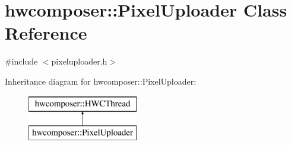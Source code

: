 \hypertarget{classhwcomposer_1_1PixelUploader}{}\section{hwcomposer\+:\+:Pixel\+Uploader Class Reference}
\label{classhwcomposer_1_1PixelUploader}


{\ttfamily \#include $<$pixeluploader.\+h$>$}

Inheritance diagram for hwcomposer\+:\+:Pixel\+Uploader\+:\begin{figure}[H]
\begin{center}
\leavevmode
\includegraphics[height=2.000000cm]{classhwcomposer_1_1PixelUploader}
\end{center}
\end{figure}
